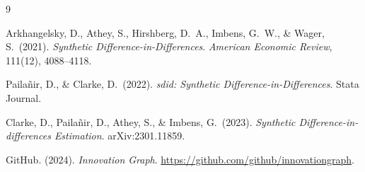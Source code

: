 \documentclass[12pt,a4paper]{article}
\begin{document}
\begin{thebibliography}{9}

Arkhangelsky, D., Athey, S., Hirshberg, D.\ A., Imbens, G.\ W., \& Wager, S.\ (2021).
\textit{Synthetic Difference-in-Differences}.
\textit{American Economic Review}, 111(12), 4088--4118.

Pailañir, D., \& Clarke, D.\ (2022).
\textit{sdid: Synthetic Difference-in-Differences}.
Stata Journal.

Clarke, D., Pailañir, D., Athey, S., \& Imbens, G.\ (2023).
\textit{Synthetic Difference-in-differences Estimation}.
arXiv:2301.11859.

GitHub. (2024). \textit{Innovation Graph}. \url{https://github.com/github/innovationgraph}.

\end{thebibliography}
\end{document}
